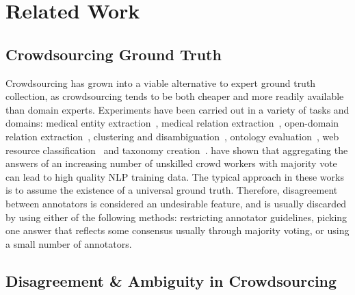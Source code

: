 \section{Related Work}
\label{sec:relatedwork}

\subsection{Crowdsourcing Ground Truth}

Crowdsourcing has grown into a viable alternative to expert ground truth collection, as crowdsourcing tends to be both cheaper and more readily available than domain experts. Experiments have been carried out in a variety of tasks and domains:  medical entity extraction~\cite{zhai2013web,Finin2010,van2012eu}, medical relation extraction~\cite{kilicoglu2011constructing,van2012eu}, open-domain relation extraction~\cite{kondreddi2014combining}, clustering and disambiguation~\cite{Lee2013}, ontology evaluation~\cite{noy2013mechanical}, web resource classification~\cite{castano2016human} and taxonomy creation~\cite{bragg2013crowdsourcing}. \cite{Snow2008} have shown that aggregating the answers of an increasing number of unskilled crowd workers with majority vote can lead to high quality NLP training data. The typical approach in these works is to assume the existence of a universal ground truth. Therefore, disagreement between annotators is considered an undesirable feature, and is usually discarded by using either of the following methods: restricting annotator guidelines, picking one answer that reflects some consensus usually through majority voting, or using a small number of annotators.


\subsection{Disagreement \& Ambiguity in Crowdsourcing}

